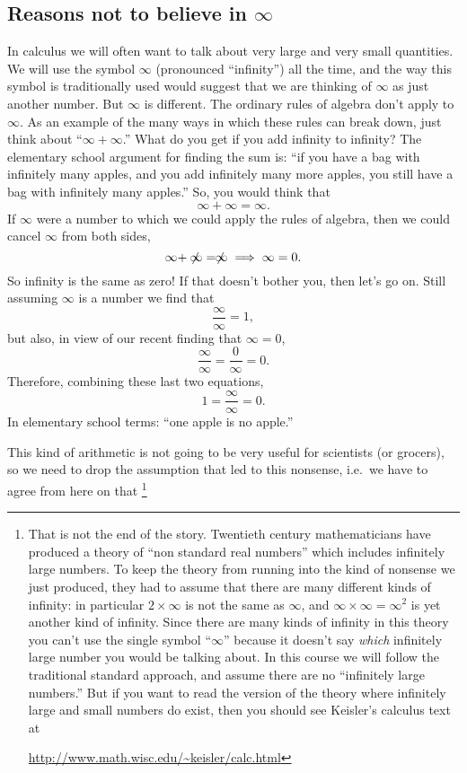 \subsection{Reasons not to believe in $\infty$} 
\label{sec:infinity-not-a-number}
In calculus we will often want to talk about very large and very small
quantities.  We will use the symbol $\infty$ (pronounced ``infinity'')
all the time, and the way this symbol is traditionally used would suggest that we
are thinking of $\infty$ as just another number.  But $\infty$ is
different.  The ordinary rules of algebra don't apply to $\infty$.  As
an example of the many ways in which these rules can break down, just
think about ``$\infty + \infty$.''  What do you get if you add
infinity to infinity?  The elementary school argument for finding the
sum is: ``if you have a bag with infinitely many apples, and you add
infinitely many more apples, you still have a bag with infinitely many
apples.'' So, you would think that
\[
\infty + \infty = \infty.
\]
If $\infty$ were a number to which we could apply the rules of
algebra, then we could cancel $\infty$ from both sides,
\[
\infty + \not\!\!\infty = \not\!\!\infty \implies \infty = 0.
\]
So infinity is the same as zero!  If that doesn't bother you, then
let's go on.  Still assuming $\infty$ is a number we find that
\[
\frac{\infty}{\infty} = 1,
\]
but also, in view of our recent finding that $\infty = 0$,
\[
\frac{\infty}{\infty} = \frac{0}{\infty} = 0.
\]
Therefore, combining these last two equations,
\[
1=\frac { \infty }{\infty}=0.
\]
In elementary school terms: ``one apple is no apple.''


This kind of arithmetic is not going to be very useful for scientists (or
grocers), so we need to drop the assumption that led to this nonsense,
i.e.\ we have to agree from here on that \footnote{That is not the end of
  the story.  Twentieth century mathematicians have produced a theory of
  ``non standard real numbers'' which includes infinitely large numbers.
  To keep the theory from running into the kind of nonsense we just
  produced, they had to assume that there are many different kinds of
  infinity: in particular $2\times\infty$ is not the same as $\infty$, and
  $\infty\times\infty = \infty^2$ is yet another kind of infinity.  Since
  there are many kinds of infinity in this theory you can't use the single
  symbol ``$\infty$'' because it doesn't say \emph{which} infinitely large
  number you would be talking about.  In this course we will follow the
  traditional standard approach, and assume there are no ``infinitely large
  numbers.'' But if you want to read the version of the theory where
  infinitely large and small numbers do exist, then you should see
  Keisler's calculus text at
  \centerline{\url{http://www.math.wisc.edu/~keisler/calc.html}} }
\begin{center}
\end{center}


